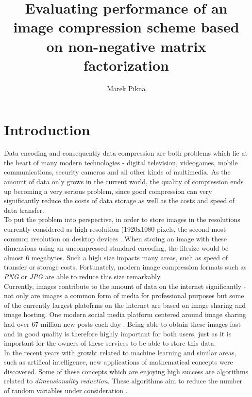 \documentclass[thesis=M,english]{FITthesis}[2012/10/20]
\title{Evaluating performance of an image compression scheme based on non-negative matrix factorization}
\author{Marek Pikna} %
\begin{document}

\chapter{Introduction}
Data encoding and consequently data compression are both problems which lie
at the heart of many modern technologies - digital television, videogames, mobile
communications, security cameras and all other kinds of multimedia. As the amount
of data only grows in the current world, the quality of
compression ends up becoming a very serious problem, since good compression can
very significantly reduce the costs of data storage as well as the costs and speed
of data transfer.
\\

To put the problem into perspective, in order to store images in the resolutions
currently considered as high resolution (1920x1080 pixels, the second most common
resolution on desktop devices \cite{res-stats}.
When storing an image with these dimensions using an uncompressed standard encoding,
the filesize would be almost 6 megabytes. Such a high size impacts many areas, such as
speed of transfer or storage costs. Fortunately, modern image compression formats such as
\emph{PNG} or \emph{JPG} are able to reduce this size remarkably.
\\

Currently, images contribute to the amount of data on the internet significantly - not only are images a common
form of media for professional purposes but some of the currently largest platofrms on the
internet are based on image sharing and image hosting. One modern social media platform centered around image
sharing had over 67 million new posts each day \cite{data-amount}.
Being able to obtain these images fast and in good quality is therefore highly important for both users, just
as it is important for the owners of these services to be able to store this data.
\\

In the recent years with growht related to machine learning and similar areas, such as artifical
intelligence, new applications of mathematical concepts were discovered. Some of these concepts
which are enjoying high success are algorithms related to \emph{dimensionality reduction}. These
algorithms aim to reduce the number of random variables under consideration \cite{dimens-reduction}.
\\
\end{document}
